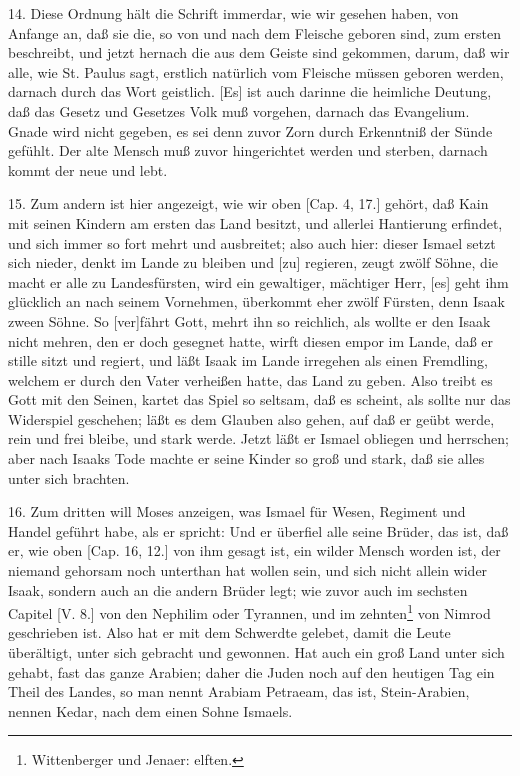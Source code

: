 14. Diese Ordnung hält die Schrift immerdar, wie wir gesehen haben, von Anfange an, daß sie die, so von und nach dem Fleische geboren sind, zum ersten beschreibt, und jetzt hernach die aus dem Geiste sind gekommen, darum, daß wir alle, wie St. Paulus sagt, erstlich natürlich vom Fleische müssen geboren werden, darnach durch das Wort geistlich. [Es] ist auch darinne die heimliche Deutung, daß das Gesetz und Gesetzes Volk muß vorgehen, darnach das Evangelium. Gnade wird nicht gegeben, es sei denn zuvor Zorn durch Erkenntniß der Sünde gefühlt. Der alte Mensch muß zuvor hingerichtet werden und sterben, darnach kommt der neue und lebt.

15. Zum andern ist hier angezeigt, wie wir oben [Cap. 4, 17.] gehört, daß Kain mit seinen Kindern am ersten das Land besitzt, und allerlei Hantierung erfindet, und sich immer so fort mehrt und ausbreitet; also auch hier: dieser Ismael setzt sich nieder, denkt im Lande zu bleiben und [zu] regieren, zeugt zwölf Söhne, die macht er alle zu Landesfürsten, wird ein gewaltiger, mächtiger Herr, [es] geht ihm glücklich an nach seinem Vornehmen, überkommt eher zwölf Fürsten, denn Isaak zween Söhne. So [ver]fährt Gott, mehrt ihn so reichlich, als wollte er den Isaak nicht mehren, den er doch gesegnet hatte, wirft diesen empor im Lande, daß er stille sitzt und regiert, und läßt Isaak im Lande irregehen als einen Fremdling, welchem er durch den Vater verheißen hatte, das Land zu geben. Also treibt es Gott mit den Seinen, kartet das Spiel so seltsam, daß es scheint, als sollte nur das Widerspiel geschehen; läßt es dem Glauben also gehen, auf daß er geübt werde, rein und frei bleibe, und stark werde. Jetzt läßt er Ismael obliegen und herrschen; aber nach Isaaks Tode machte er seine Kinder so groß und stark, daß sie alles unter sich brachten.

16. Zum dritten will Moses anzeigen, was Ismael für Wesen, Regiment und Handel geführt habe, als er spricht: Und er überfiel alle seine Brüder, das ist, daß er, wie oben [Cap. 16, 12.] von ihm gesagt ist, ein wilder Mensch worden ist, der niemand gehorsam noch unterthan hat wollen sein, und sich nicht allein wider Isaak, sondern auch an die andern Brüder legt; wie zuvor auch im sechsten Capitel [V. 8.] von den Nephilim oder Tyrannen, und im zehnten\footnote{Wittenberger und Jenaer: elften.} von Nimrod geschrieben ist. Also hat er mit dem Schwerdte gelebet, damit die Leute überältigt, unter sich gebracht und gewonnen. Hat auch ein groß Land unter sich gehabt, fast das ganze Arabien; daher die Juden noch auf den heutigen Tag ein Theil des Landes, so man nennt Arabiam Petraeam, das ist, Stein-Arabien, nennen Kedar, nach dem einen Sohne Ismaels.

